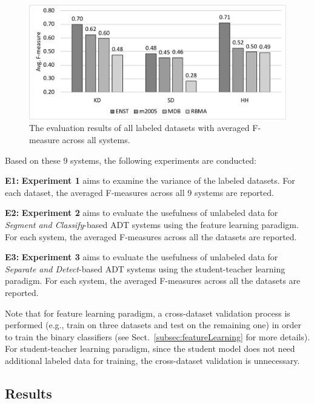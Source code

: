 \documentclass{article}
\begin{document}
\begin{figure}
\centering
\includegraphics[width = \columnwidth]{./figs/avgAcrossDatasets.pdf}
\caption{The evaluation results of all labeled datasets with averaged F-measure across all systems.}
\label{fig:resultsAcrossDatasets}
\end{figure}

Based on these 9 systems, the following experiments are conducted:
\begin{compactenum}
\item [\textbf{E1:}]\textbf{Experiment 1} aims to examine the variance of the labeled datasets. For each dataset, the averaged F-measures across all 9 systems are reported. 
\item [\textbf{E2:}]\textbf{Experiment 2} aims to evaluate the usefulness of unlabeled data for \textit{Segment and Classify}-based ADT systems using the feature learning paradigm. For each system, the averaged F-measures across all the datasets are reported. 
\item [\textbf{E3:}]\textbf{Experiment 3} aims to evaluate the usefulness of unlabeled data for \textit{Separate and Detect}-based ADT systems using the student-teacher learning paradigm. For each system, the averaged F-measures across all the datasets are reported. \\
\end{compactenum}
Note that for feature learning paradigm, a cross-dataset validation process is performed (e.g., train on three datasets and test on the remaining one) in order to train the binary classifiers (see Sect.~\ref{subsec:featureLearning} for more details). For student-teacher learning paradigm, since the student model does not need additional labeled data for training, the cross-dataset validation is unnecessary. 

\subsection{Results}
\end{document}
